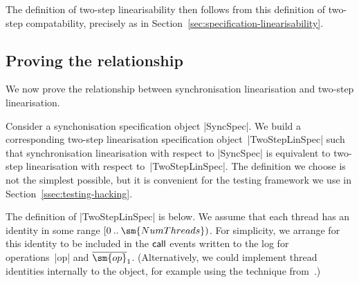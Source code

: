 The definition of two-step linearisability then follows from this definition
of two-step compatability, precisely as in
Section~\ref{sec:specification-linearisability}.



\subsection{Proving the relationship}
\label{sec:twoStepLinSpec}

We now prove the relationship between synchronisation linearisation and
two-step linearisation.

Consider a synchonisation specification object |SyncSpec|.  We build a
corresponding two-step linearisation specification object~|TwoStepLinSpec|
such that synchronisation linearisation with respect to |SyncSpec| is
equivalent to two-step linearisation with respect to~|TwoStepLinSpec|.  The
definition we choose is not the simplest possible, but it is convenient for
the testing framework we use in Section~\ref{ssec:testing-hacking}.  

The definition of |TwoStepLinSpec| is below.  We assume that each thread has
an identity in some range $\range 0 {\sm{NumThreads}}$.  For simplicity, we
arrange for this identity to be included in the $\mathsf{call}$ events written to the
log for operations~|op| and $\overline{\sm{op}}_1$.  (Alternatively, we
could implement thread identities internally to the object, for example using
the technique from~\cite[Appendix~A.2.4]{herlihy-shavit}.)

